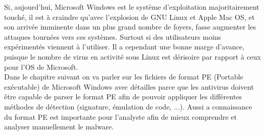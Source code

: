 Si, aujourd'hui, Microsoft Windows est le système d'exploitation majoritairement touché, il est à craindre qu'avec l'explosion de GNU Linux et Apple Mac OS, et son arrivée imminente dans un plus grand nombre de foyers, fasse augmenter les attaques tournées vers ces systèmes. Surtout si des utilisateurs moins expérimentés viennent à l'utiliser. Il a cependant
une bonne marge d'avance, puisque le nombre de virus en activité sous Linux est dérisoire par rapport à ceux pour l'OS de Microsoft.\\


Dans le chapitre suivant on va parler sur les fichiers de format PE (Portable exécutable) 
de Microsoft Windows avec détailles parce que les antivirus doivent être capable de parser le format PE afin de pouvoir appliquer les différentes méthodes de détection (signature, émulation de code, ...). Aussi a connaissance du format PE est importante pour l'analyste afin de mieux comprendre et analyser manuellement le malware.